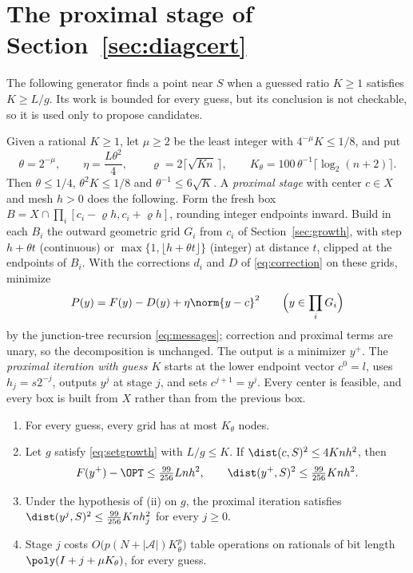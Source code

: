 \section{The proximal stage of Section~\ref{sec:diagcert}}\label{app:proximal}


The following generator finds a point near $S$ when a guessed ratio
$K\ge1$ satisfies $K\ge L/g$. Its work is bounded for every guess, but its
conclusion is not checkable, so it is used only to propose candidates.

Given a rational $K\ge1$, let $\mu\ge2$ be the least integer with
$4^{-\mu}K\le1/8$, and put
\[
\theta=2^{-\mu},\qquad\eta=\frac{L\theta^2}4,\qquad
\varrho=2\bigl\lceil\sqrt{Kn}\,\bigr\rceil,\qquad
K_\theta=100\,\theta^{-1}\lceil\log_2(n+2)\rceil .
\]
Then $\theta\le1/4$, $\theta^2K\le1/8$ and $\theta^{-1}\le6\sqrt K$.
A \emph{proximal stage} with center $c\in X$ and mesh $h>0$ does the
following. Form the fresh box $B=X\cap\prod_i[c_i-\varrho h,c_i+\varrho h]$,
rounding integer endpoints inward. Build in each $B_i$ the outward geometric
grid $G_i$ from $c_i$ of Section~\ref{sec:growth}, with step $h+\theta t$
(continuous) or $\max\{1,\lfloor h+\theta t\rfloor\}$ (integer) at distance
$t$, clipped at the endpoints of $B_i$. With the corrections $d_i$ and $D$ of
\eqref{eq:correction} on these grids, minimize
\[
P(y)=F(y)-D(y)+\eta\norm{y-c}^2\qquad\Bigl(y\in\prod_iG_i\Bigr)
\]
by the junction-tree recursion \eqref{eq:messages}; correction and proximal
terms are unary, so the decomposition is unchanged. The output is a
minimizer $y^+$. The \emph{proximal iteration with guess $K$} starts at the
lower endpoint vector $c^0=l$, uses $h_j=s2^{-j}$, outputs $y^j$ at stage $j$,
and sets $c^{j+1}=y^j$. Every center is feasible, and every box is built from
$X$ rather than from the previous box.

\begin{lemma}\label{lem:proximal}
\begin{enumerate}
\item[(i)] For every guess, every grid has at most $K_\theta$ nodes.
\item[(ii)] Let $g$ satisfy \eqref{eq:setgrowth} with $L/g\le K$. If
$\dist(c,S)^2\le4Knh^2$, then
\[
F(y^+)-\OPT\le\tfrac{99}{256}Lnh^2,\qquad
\dist(y^+,S)^2\le\tfrac{99}{256}Knh^2 .
\]
\item[(iii)] Under the hypothesis of (ii) on $g$, the proximal iteration
satisfies $\dist(y^j,S)^2\le\frac{99}{256}Knh_j^2$ for every $j\ge0$.
\item[(iv)] Stage $j$ costs $O\bigl(p(N+|\mathcal A|)K_\theta^p\bigr)$ table
operations on rationals of bit length $\poly(I+j+\mu K_\theta)$, for every
guess.
\end{enumerate}
\end{lemma}

